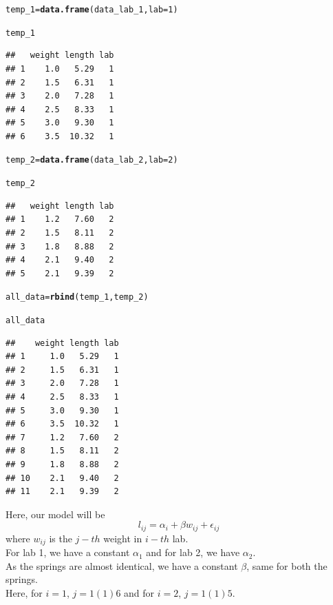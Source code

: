 \documentclass[11pt, a4paper]{article}\usepackage[]{graphicx}\usepackage[]{xcolor}
\makeatletter
\newcommand{\hlnum}[1]{\textcolor[rgb]{0.686,0.059,0.569}{#1}}%
\newcommand{\hldef}[1]{\textcolor[rgb]{0.345,0.345,0.345}{#1}}%
\newcommand{\hlkwb}[1]{\textcolor[rgb]{0.69,0.353,0.396}{#1}}%
\newcommand{\hlkwc}[1]{\textcolor[rgb]{0.333,0.667,0.333}{#1}}%
\newcommand{\hlkwd}[1]{\textcolor[rgb]{0.737,0.353,0.396}{\textbf{#1}}}%
\newenvironment{kframe}{%
 \def\at@end@of@kframe{}%
 \ifinner\ifhmode%
  \def\at@end@of@kframe{\end{minipage}}%
  \begin{minipage}{\columnwidth}%
 \fi\fi%
 \def\FrameCommand##1{\hskip\@totalleftmargin \hskip-\fboxsep
 \colorbox{shadecolor}{##1}\hskip-\fboxsep
     \hskip-\linewidth \hskip-\@totalleftmargin \hskip\columnwidth}%
 \MakeFramed {\advance\hsize-\width
   \@totalleftmargin\z@ \linewidth\hsize
   \@setminipage}}%
 {\par\unskip\endMakeFramed%
 \at@end@of@kframe}
\newenvironment{knitrout}{}{} %
\makeatother
\begin{document}
\begin{knitrout}
\color{fgcolor}\begin{kframe}
\begin{alltt}
\hldef{temp_1} \hlkwb{=} \hlkwd{data.frame}\hldef{(data_lab_1,} \hlkwc{lab} \hldef{=} \hlnum{1}\hldef{)}

\hldef{temp_1}
\end{alltt}
\begin{verbatim}
##   weight length lab
## 1    1.0   5.29   1
## 2    1.5   6.31   1
## 3    2.0   7.28   1
## 4    2.5   8.33   1
## 5    3.0   9.30   1
## 6    3.5  10.32   1
\end{verbatim}
\begin{alltt}
\hldef{temp_2} \hlkwb{=} \hlkwd{data.frame}\hldef{(data_lab_2,} \hlkwc{lab} \hldef{=} \hlnum{2}\hldef{)}

\hldef{temp_2}
\end{alltt}
\begin{verbatim}
##   weight length lab
## 1    1.2   7.60   2
## 2    1.5   8.11   2
## 3    1.8   8.88   2
## 4    2.1   9.40   2
## 5    2.1   9.39   2
\end{verbatim}
\begin{alltt}
\hldef{all_data} \hlkwb{=} \hlkwd{rbind}\hldef{(temp_1, temp_2)}

\hldef{all_data}
\end{alltt}
\begin{verbatim}
##    weight length lab
## 1     1.0   5.29   1
## 2     1.5   6.31   1
## 3     2.0   7.28   1
## 4     2.5   8.33   1
## 5     3.0   9.30   1
## 6     3.5  10.32   1
## 7     1.2   7.60   2
## 8     1.5   8.11   2
## 9     1.8   8.88   2
## 10    2.1   9.40   2
## 11    2.1   9.39   2
\end{verbatim}
\end{kframe}
\end{knitrout}

Here, our model will be $$ l_{ij} = \alpha_i + \beta w_{ij} + \epsilon_{ij} $$
where $w_{ij}$ is the $j-th$ weight in $i-th$ lab. \\

For lab 1, we have a constant $\alpha_1$ and for lab 2, we have $\alpha_2$. \\

As the springs are almost identical, we have a constant $\beta$, same for both the springs. \\

Here, for $i=1$, $j=1(1)6$ and for $i=2$, $j=1(1)5$. \\
\end{document}
